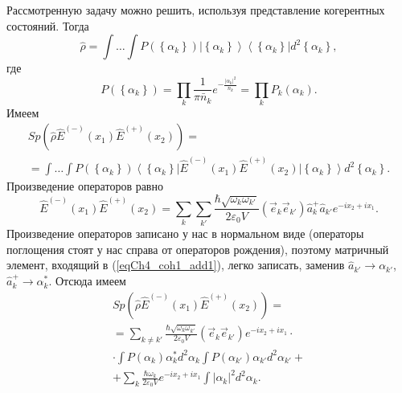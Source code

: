 Рассмотренную задачу можно решить, используя представление когерентных
состояний. Тогда
\begin{equation}
\hat{\rho} = \int \dots \int P\left(\left\{\alpha_k\right\}\right)
\left|\left\{\alpha_k\right\}\right>\left<\left\{\alpha_k\right\}\right|d^2 \left\{\alpha_k\right\},
\nonumber
\end{equation}
где
\begin{equation}
P\left(\left\{\alpha_k\right\}\right) = \prod_k\frac{1}{\pi
  \bar{n}_k}e^{-\frac{\left|\alpha_k\right|^2}{\bar{n}_k}}=
\prod_k P_k\left(\alpha_k\right).
\nonumber
\end{equation}
Имеем
\begin{eqnarray}
Sp \left(
\hat{\rho}\hat{E}^{(-)}\left(x_1\right)
\hat{E}^{(+)}\left(x_2\right)
\right) = 
\nonumber \\
= \int \dots \int
P\left(\left\{\alpha_k\right\}\right)
\left<\left\{\alpha_k\right\}\right|
\hat{E}^{(-)}\left(x_1\right)
\hat{E}^{(+)}\left(x_2\right)
\left|\left\{\alpha_k\right\}\right>
d^2 \left\{\alpha_k\right\}.
\label{eqCh4_coh1_add1}
\end{eqnarray}
Произведение операторов равно
\begin{equation}
\hat{E}^{(-)}\left(x_1\right)
\hat{E}^{(+)}\left(x_2\right) = 
\sum_k \sum_{k'}
\frac{\hbar\sqrt{\omega_{k}\omega_{k'}}}{2 \varepsilon_0 V}
\left(\vec{e}_{k}\vec{e}_{k'}\right)\hat{a}^{+}_{k}\hat{a}_{k'}
e^{-i x_2 + i x_1}.
\nonumber
\end{equation}
Произведение операторов записано у нас в нормальном виде (операторы
поглощения стоят у нас справа от операторов рождения), поэтому
матричный элемент, входящий в (\ref{eqCh4_coh1_add1}), легко записать,
заменив $\hat{a}_{k'} \rightarrow \alpha_{k'}$, $\hat{a}^{+}_{k}
\rightarrow \alpha^{*}_{k}$. Отсюда имеем
\begin{eqnarray}
Sp \left(
\hat{\rho}\hat{E}^{(-)}\left(x_1\right)
\hat{E}^{(+)}\left(x_2\right)
\right) = 
\nonumber \\
= 
\sum_{k \ne k'}
\frac{\hbar\sqrt{\omega_{k}\omega_{k'}}}{2 \varepsilon_0 V}
\left(\vec{e}_{k}\vec{e}_{k'}\right)
e^{-i x_2 + i x_1}
\cdot
\nonumber \\
\cdot
\int 
P\left(\alpha_{k}\right)
\alpha^{*}_{k}
d^2 \alpha_{k} 
\int 
P\left(\alpha_{k'}\right)
\alpha_{k'}
d^2 \alpha_{k'} +
\nonumber \\
+
\sum_k 
\frac{\hbar\omega_{k}}{2 \varepsilon_0 V}
e^{-i x_2 + i x_1}
\int 
\left|
\alpha_{k}
\right|^2
d^2 \alpha_{k}.
\label{eqCh4_coh1_add2}
\end{eqnarray}
